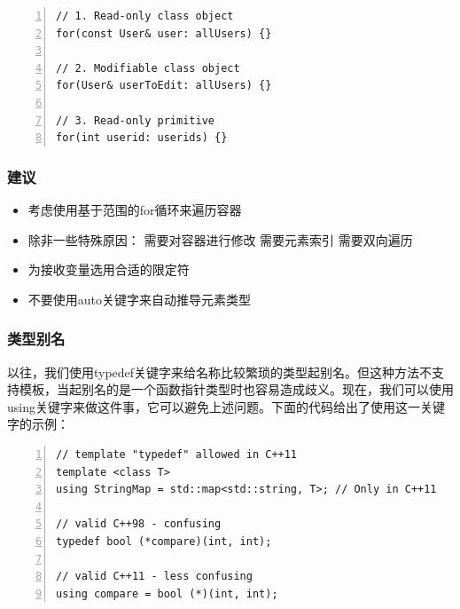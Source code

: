 \documentclass{ctexart}
\begin{document}
\begin{lstlisting}[language={[ANSI]C},keywordstyle=\color{blue!70},commentstyle=\color{red!50!green!50!blue!50},frame=shadowbox, rulesepcolor=\color{red!20!green!20!blue!20},basicstyle=\small,numbers=left, numberstyle=\tiny,breaklines=true]
// 1. Read-only class object
for(const User& user: allUsers) {}

// 2. Modifiable class object
for(User& userToEdit: allUsers) {}

// 3. Read-only primitive
for(int userid: userids) {}
\end{lstlisting}

\subsubsection*{建议}

\begin{itemize}
	\item 考虑使用基于范围的for循环来遍历容器
	\item 除非一些特殊原因：
	\subitem 需要对容器进行修改
	\subitem 需要元素索引
	\subitem 需要双向遍历
	\item 为接收变量选用合适的限定符
	\item 不要使用auto关键字来自动推导元素类型
\end{itemize}

\subsubsection{类型别名}

以往，我们使用typedef关键字来给名称比较繁琐的类型起别名。但这种方法不支持模板，当起别名的是一个函数指针类型时也容易造成歧义。现在，我们可以使用using关键字来做这件事，它可以避免上述问题。下面的代码给出了使用这一关键字的示例：

\begin{lstlisting}[language={[ANSI]C},keywordstyle=\color{blue!70},commentstyle=\color{red!50!green!50!blue!50},frame=shadowbox, rulesepcolor=\color{red!20!green!20!blue!20},basicstyle=\small,numbers=left, numberstyle=\tiny,breaklines=true]
// template "typedef" allowed in C++11  
template <class T>  
using StringMap = std::map<std::string, T>; // Only in C++11  

// valid C++98 - confusing  
typedef bool (*compare)(int, int);

// valid C++11 - less confusing  
using compare = bool (*)(int, int);
\end{lstlisting}
\end{document}
